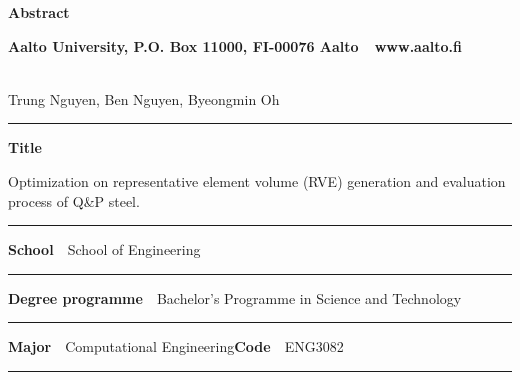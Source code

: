 \newpage
{}
\setlength{\parskip}{0pt}

\begin{spacing}{.88}

{\parindent0pt %

{\fontsize{13.9pt}{13.9pt}\selectfont
\vspace{-8.9mm}\hfill{\bfseries\sffamily\lsstyle Abstract}}

{\fontsize{9.48pt}{9.48pt}\selectfont
\vspace{.9mm}\hfill{\bfseries\sffamily\lsstyle Aalto University, P.O. Box 11000, FI-00076 Aalto~~\textcolor{aaltoGray}{www.aalto.fi}}}

\\
{\small Trung Nguyen, Ben Nguyen, Byeongmin Oh}

\vspace{-2.4mm}\rule{\textwidth}{.75pt}

{\fontsize{10.5pt}{10.5pt}\bfseries\sffamily\lsstyle Title}\\
\parbox[t]{\textwidth}{\raggedright\small Optimization on representative element volume (RVE) generation and evaluation process of Q\&P steel.}

\vspace{.5mm}\rule{\textwidth}{.75pt}

{\fontsize{10.5pt}{10.5pt}\bfseries\sffamily\lsstyle School}~~{\small School of Engineering}

\vspace{-2.4mm}\rule{\textwidth}{.75pt}

{\fontsize{10.5pt}{10.5pt}\bfseries\sffamily\lsstyle Degree programme}~~{\small Bachelor’s Programme in Science and Technology}

\vspace{-2.4mm}\rule{\textwidth}{.75pt}

{\fontsize{10.5pt}{10.5pt}\bfseries\sffamily\lsstyle Major}~~{\small Computational Engineering}\hfill{\fontsize{10.5pt}{10.5pt}\bfseries\sffamily\lsstyle Code}~~{\small ENG3082}

\vspace{-2.4mm}\rule{\textwidth}{.75pt}

}
\end{spacing}
